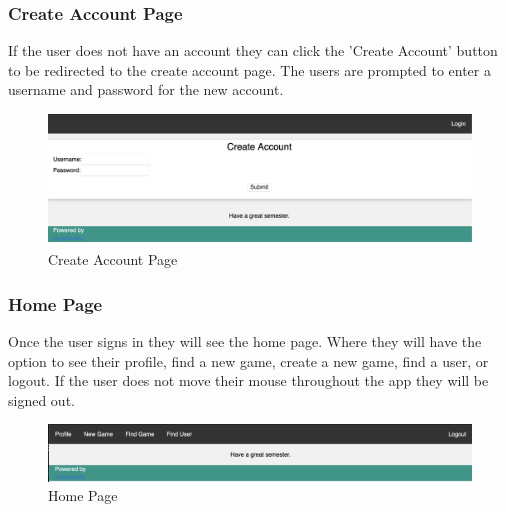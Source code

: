 \documentclass[12pt]{article}
\begin{document}
\subsubsection{Create Account Page}
If the user does not have an account they can click the 'Create Account' button to be redirected to the 
create account page. The users are prompted to enter a username and password for the new account.
\begin{figure}[h!]
    \includegraphics[width=\linewidth]{CREATE_ACCOUNT.png}
    \caption{Create Account Page}
\end{figure}

\subsubsection{Home Page}
Once the user signs in they will see the home page. Where they will have the option to see their profile, find a new game, create a new game, find a user, or logout. If the user does not move their mouse throughout the app they will be signed out.
\begin{figure}[h!]
    \includegraphics[width=\linewidth]{HOME_PAGE_ONCE_LOGGED_IN.png}
    \caption{Home Page}
\end{figure}
\end{document}
